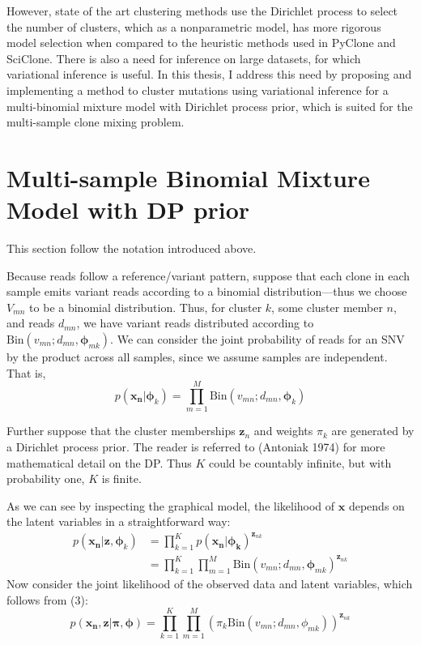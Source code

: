 \documentclass[11pt]{article}
\newcommand{\bx}{\ensuremath{\mathbf{x}}}
\newcommand{\bz}{\ensuremath{\mathbf{z}}}
\newcommand{\bphi}{\ensuremath{\bm{\phi}}}
\begin{document}
However, state of the art clustering methods use the Dirichlet process to select the number of clusters, which as a nonparametric model, has more rigorous model selection when compared to the heuristic methods used in PyClone and SciClone. There is also a need for inference on large datasets, for which variational inference is useful. In this thesis, I address this need by proposing and implementing a method to cluster mutations using variational inference for a multi-binomial mixture model with Dirichlet process prior, which is suited for the multi-sample clone mixing problem.

\newpage

\section{Multi-sample Binomial Mixture Model with DP prior}

This section follow the notation introduced above.

Because reads follow a reference/variant pattern, suppose that each clone in each sample emits variant reads according to a binomial distribution---thus we choose $V_{mn}$ to be a binomial distribution. Thus, for cluster $k$, some cluster member $n$, and reads $d_{mn}$, we have variant reads distributed according to $\mathrm{Bin}(v_{mn}; d_{mn}, \bphi_{mk})$. We can consider the joint probability of reads for an SNV by the product across all samples, since we assume samples are independent. That is,
\begin{equation}
p(\mathbf{x_n} | \bphi_k) = \prod\limits_{m=1}^M \mathrm{Bin}(v_{mn}; d_{mn}, \bphi_k)
\end{equation}

Further suppose that the cluster memberships $\bz_n$ and weights $\pi_k$ are generated by a Dirichlet process prior. The reader is referred to (Antoniak 1974) for more mathematical detail on the DP. Thus $K$ could be countably infinite, but with probability one, $K$ is finite.

 As we can see by inspecting the graphical model, the likelihood of $\bx$ depends on the latent variables in a straightforward way:
\begin{align}
p(\mathbf{x_n} | \bz, \bphi_k) &= \prod\limits_{k=1}^K p(\mathbf{x_n} | \mathbf{\phi_k})^{\bz_{nk}} \nonumber \\
										&= \prod\limits_{k=1}^K \prod\limits_{m=1}^M \mathrm{Bin}(v_{mn}; d_{mn}, \bphi_{mk})^{\bz_{nk}}
\end{align}
Now consider the joint likelihood of the observed data and latent variables, which follows from (3): 
\begin{equation}
p(\mathbf{x_n}, \bz | \bm{\pi}, \bphi) = \prod\limits_{k=1}^K \prod\limits_{m=1}^M \left(\pi_k \mathrm{Bin}(v_{mn}; d_{mn}, \phi_{mk})\right)^{\bz_{nk}}
\end{equation}
\end{document}
